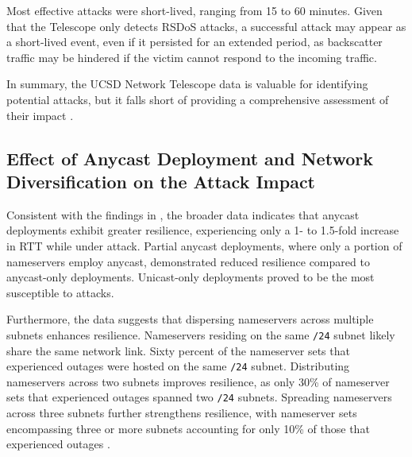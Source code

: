 Most effective attacks were short-lived, ranging from 15 to 60 minutes.
Given that the Telescope only detects \ac{RSDoS} attacks, a successful attack may appear as a short-lived event, even if it persisted for an extended period, as backscatter traffic may be hindered if the victim cannot respond to the incoming traffic.

In summary, the UCSD Network Telescope data is valuable for identifying potential attacks, but it falls short of providing a comprehensive assessment of their impact \cite{Sommese2022DDoSDNS}.


\subsection{Effect of Anycast Deployment and Network Diversification on the Attack Impact} \label{subsec:soa_anycastdeploymentandnetworkdiversification}
Consistent with the findings in , the broader data indicates that anycast deployments exhibit greater resilience, experiencing only a 1- to 1.5-fold increase in RTT while under attack.
Partial anycast deployments, where only a portion of nameservers employ anycast, demonstrated reduced resilience compared to anycast-only deployments.
Unicast-only deployments proved to be the most susceptible to attacks.

Furthermore, the data suggests that dispersing nameservers across multiple subnets enhances resilience.
Nameservers residing on the same \texttt{/24} subnet likely share the same network link.
Sixty percent of the nameserver sets that experienced outages were hosted on the same \texttt{/24} subnet.
Distributing nameservers across two subnets improves resilience, as only 30\% of nameserver sets that experienced outages spanned two \texttt{/24} subnets.
Spreading nameservers across three subnets further strengthens resilience, with nameserver sets encompassing three or more subnets accounting for only 10\% of those that experienced outages \cite{Sommese2022DDoSDNS}.